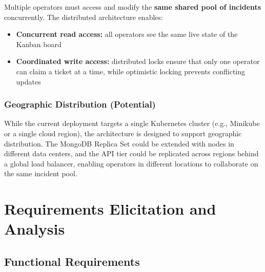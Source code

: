 \documentclass{scrartcl}
\begin{document}
Multiple operators must access and modify the \textbf{same shared pool of incidents} concurrently.
The distributed architecture enables:
%
\begin{itemize}
    \item \textbf{Concurrent read access:} all operators see the same live state of the Kanban board
    \item \textbf{Coordinated write access:} distributed locks ensure that only one operator can claim a ticket at a time, while optimistic locking prevents conflicting updates
\end{itemize}

\subsubsection{Geographic Distribution (Potential)}\label{geo-distribution}

While the current deployment targets a single Kubernetes cluster (e.g., Minikube or a single cloud region), the architecture is designed to support geographic distribution.
The MongoDB Replica Set could be extended with nodes in different data centers, and the API tier could be replicated across regions behind a global load balancer, enabling operators in different locations to collaborate on the same incident pool.

\section{Requirements Elicitation and Analysis}\label{requirements}

\subsection{Functional Requirements}\label{functional-requirements}
\end{document}
